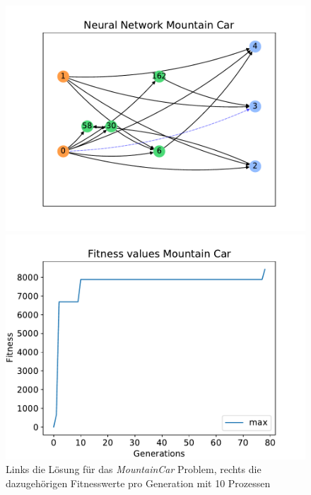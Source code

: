 \begin{figure}[!h]
	\centering
	\begin{minipage}[]{0.49\textwidth}
		\includegraphics[width=1.0\textwidth]{./img/mountain_car_single/mountain_car_neural_network.pdf} 
	\end{minipage}
	\hfill
	\begin{minipage}[]{0.49\textwidth}
		\includegraphics[width=1.0\textwidth]{./img/mountain_car_single/1413_fitness_1core_1pi.pdf} 
	\end{minipage}
	\caption{Links die Lösung für das \emph{MountainCar} Problem, rechts die dazugehörigen Fitnesswerte pro Generation mit 10 Prozessen}
	\label{fig:mountain_car_10core_neural_network_and_fitness}
\end{figure}
